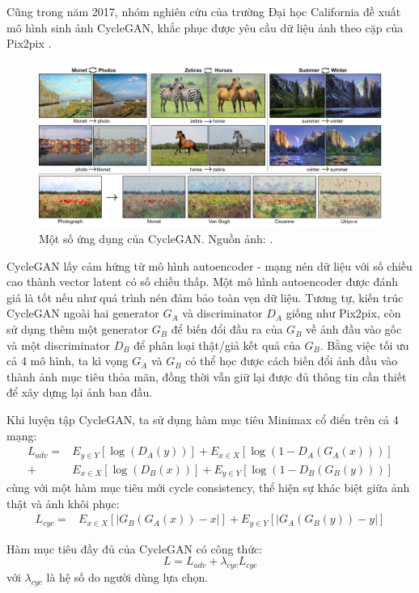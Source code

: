 \documentclass[12pt]{extreport}
\begin{document}
Cũng trong năm 2017, nhóm nghiên cứu của trường Đại học California đề xuất mô hình sinh ảnh CycleGAN, khắc phục được yêu cầu dữ liệu ảnh theo cặp của Pix2pix \cite{CycleGAN2017}.

\begin{figure}[H]
    \centering
    \includegraphics[width=\textwidth]{figure15}
    \caption{Một số ứng dụng của CycleGAN. Nguồn ảnh: \cite{CycleGAN2017}.}
\end{figure}

CycleGAN lấy cảm hứng từ mô hình autoencoder - mạng nén dữ liệu với số chiều cao thành vector latent có số chiều thấp. Một mô hình autoencoder được đánh giá là tốt nếu như quá trình nén đảm bảo toàn vẹn dữ liệu. Tương tự, kiến trúc CycleGAN ngoài hai generator $ G_A $ và discriminator $ D_A $ giống như Pix2pix, còn sử dụng thêm một generator $ G_B $ để biến đổi đầu ra của $ G_B $ về ảnh đầu vào gốc và một discriminator $ D_B $ để phân loại thật/giả kết quả của $ G_B $. Bằng việc tối ưu cả 4 mô hình, ta kì vọng $ G_A $ và $ G_B $ có thể học được cách biến đổi ảnh đầu vào thành ảnh mục tiêu thỏa mãn, đồng thời vẫn giữ lại được đủ thông tin cần thiết để xây dựng lại ảnh ban đầu.

Khi luyện tập CycleGAN, ta sử dụng hàm mục tiêu Minimax cổ điển trên cả 4 mạng:
\begin{align*}
    L_{adv} = & E_{y \in Y} [\log(D_A(y))] + E_{x \in X} [\log(1 - D_A(G_A(x)))] \\
    +         & E_{x \in X} [\log(D_B(x))] + E_{y \in Y} [\log(1 - D_B(G_B(y)))]
\end{align*}
cùng với một hàm mục tiêu mới cycle consistency, thể hiện sự khác biệt giữa ảnh thật và ảnh khôi phục:
\begin{align*}
    L_{cyc} = & E_{x \in X} [|G_B(G_A(x)) - x|] + E_{y \in Y} [|G_A(G_B(y)) - y|]
\end{align*}

Hàm mục tiêu đầy đủ của CycleGAN có công thức:
$$ L = L_{adv} + \lambda_{cyc} L_{cyc} $$
với $ \lambda_{cyc} $ là hệ số do người dùng lựa chọn.
\end{document}
